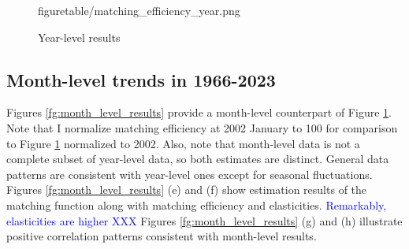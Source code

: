 \documentclass[12pt]{article}
\begin{document}
\begin{figure}[!ht]
\begin{center}
{  {figuretable/matching_efficiency_year.png}}
  \\
  \caption{Year-level results}
  \label{fg:year_level_results} 
  \end{center}
  \footnotesize
\end{figure} 


\subsection{Month-level trends in 1966-2023}

Figures \ref{fg:month_level_results} provide a month-level counterpart of Figure \ref{fg:year_level_results}. 
Note that I normalize matching efficiency at 2002 January to 100 for comparison to Figure \ref{fg:year_level_results} normalized to 2002. 
Also, note that month-level data is not a complete subset of year-level data, so both estimates are distinct.
General data patterns are consistent with year-level ones except for seasonal fluctuations.
Figures \ref{fg:month_level_results} (e) and (f) show estimation results of the matching function along with matching efficiency and elasticities.
\textcolor{blue}{
Remarkably, elasticities are higher XXX}
Figures \ref{fg:month_level_results} (g) and (h) illustrate positive correlation patterns consistent with month-level results.
\end{document}
